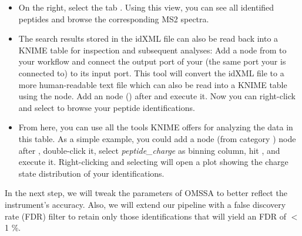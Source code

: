 \begin{itemize}
\item On the right, select the tab . Using this view, you can see all identified peptides and browse the corresponding MS2 spectra.
\item The search results stored in the idXML file can also be read back into a KNIME table for inspection and subsequent analyses: Add a  node from  to your workflow and connect the output port of your  (the same port your  is connected to) to its input port. This tool will convert the idXML file to a more human-readable text file which can also be read into a KNIME table using the  node. Add an  node () after  and execute it. Now you can right-click  and select  to browse your peptide identifications.
\item From here, you can use all the tools KNIME offers for analyzing the data in this table. As a simple example, you could add a  node (from category ) node after , double-click it, select \textit{peptide\_charge} as binning column, hit , and execute it. Right-clicking and selecting  will open a plot showing the charge state distribution of your identifications.
\end{itemize}

In the next step, we will tweak the parameters of OMSSA to better reflect the instrument's accuracy. Also, we will extend our pipeline with a false discovery rate (FDR) filter to retain only those identifications that will yield an FDR of $<$ 1 \%.

